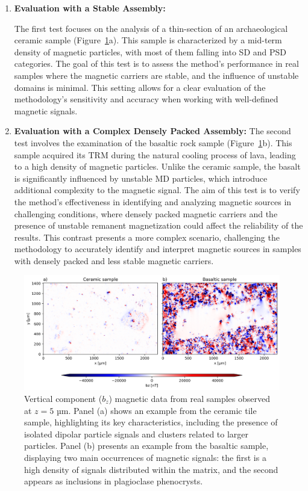 \begin{enumerate}
\item \textbf{Evaluation with a Stable Assembly:}

The first test focuses on the analysis of a thin-section of an archaeological ceramic sample (Figure~\ref{real-data-maps}a). This sample is characterized by a mid-term density of magnetic particles, with most of them falling into SD and PSD categories. The goal of this test is to assess the method’s performance in real samples where the magnetic carriers are stable, and the influence of unstable domains is minimal. This setting allows for a clear evaluation of the methodology’s sensitivity and accuracy when working with well-defined magnetic signals.

\item \textbf{Evaluation with a Complex Densely Packed Assembly:}
The second test involves the examination of the basaltic rock sample (Figure~\ref{real-data-maps}b). This sample acquired its TRM during the natural cooling process of lava, leading to a high density of magnetic particles. Unlike the ceramic sample, the basalt is significantly influenced by unstable MD particles, which introduce additional complexity to the magnetic signal. The aim of this test is to verify the method’s effectiveness in identifying and analyzing magnetic sources in challenging conditions, where densely packed magnetic carriers and the presence of unstable remanent magnetization could affect the reliability of the results. This contrast presents a more complex scenario, challenging the methodology to accurately identify and interpret magnetic sources in samples with densely packed and less stable magnetic carriers.
\end{enumerate}

\begin{figure}[tb!]
  \centering
  \includegraphics[width=1\linewidth]{paper/figures/real-data-maps.png}
  \caption{
   Vertical component (\(b_z\)) magnetic data from real samples observed at \(z = 5\) µm. Panel (a) shows an example from the ceramic tile sample, highlighting its key characteristics, including the presence of isolated dipolar particle signals and clusters related to larger particles. Panel (b) presents an example from the basaltic sample, displaying two main occurrences of magnetic signals: the first is a high density of signals distributed within the matrix, and the second appears as inclusions in plagioclase phenocrysts.
  }
  \label{real-data-maps}
\end{figure}

